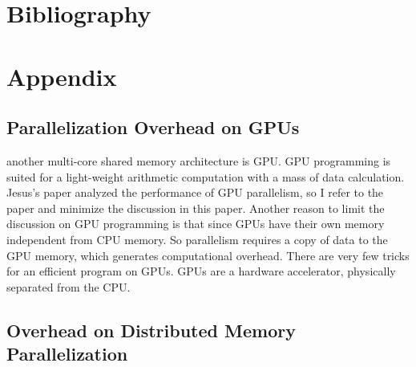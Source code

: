 \documentclass[12pt]{article}
\begin{document}
\clearpage
\section{Bibliography}
%





\clearpage
\section{Appendix}



\subsection{Parallelization Overhead on GPUs}
another multi-core shared memory architecture is GPU. GPU programming is suited for a light-weight arithmetic computation with a mass of data calculation.
Jesus's paper analyzed the performance of GPU parallelism, so I refer to the paper and minimize the discussion in this paper.
Another reason to limit the discussion on GPU programming is that since GPUs have their own memory independent from CPU memory. So parallelism requires a copy of data to the GPU memory, which generates computational overhead. There are very few tricks for an efficient program on GPUs.
GPUs are a hardware accelerator, physically separated from the CPU.


\subsection{Overhead on Distributed Memory Parallelization}
\end{document}
